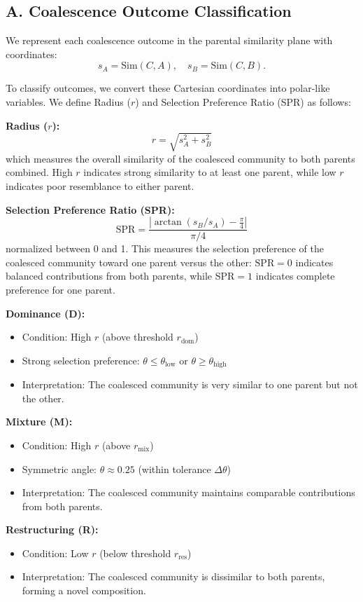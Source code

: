 \subsection*{A. Coalescence Outcome Classification}
\label{sec:suppl:classification}

We represent each coalescence outcome in the parental similarity plane with coordinates:
\begin{equation}
s_A = \text{Sim}(C, A), \quad s_B = \text{Sim}(C, B).
\end{equation}

To classify outcomes, we convert these Cartesian coordinates into polar-like variables. We define Radius ($r$) and Selection Preference Ratio (SPR) as follows:

\textbf{Radius ($r$):}
\begin{equation}
r = \sqrt{s_A^2 + s_B^2}
\end{equation}
which measures the overall similarity of the coalesced community to both parents combined. High $r$ indicates strong similarity to at least one parent, while low $r$ indicates poor resemblance to either parent.

\textbf{Selection Preference Ratio (SPR):}
\begin{equation}
\text{SPR} = \frac{\left| \arctan(s_B / s_A) - \frac{\pi}{4} \right|}{\pi/4}
\end{equation}
normalized between 0 and 1. This measures the selection preference of the coalesced community toward one parent versus the other: $\text{SPR} = 0$ indicates balanced contributions from both parents, while $\text{SPR} = 1$ indicates complete preference for one parent.

\textbf{Dominance (D):}
\begin{itemize}
    \item Condition: High $r$ (above threshold $r_{\text{dom}}$)
    \item Strong selection preference: $\theta \leq \theta_{\text{low}}$ or $\theta \geq \theta_{\text{high}}$
    \item Interpretation: The coalesced community is very similar to one parent but not the other.
\end{itemize}

\textbf{Mixture (M):}
\begin{itemize}
    \item Condition: High $r$ (above $r_{\text{mix}}$)
    \item Symmetric angle: $\theta \approx 0.25$ (within tolerance $\Delta\theta$)
    \item Interpretation: The coalesced community maintains comparable contributions from both parents.
\end{itemize}

\textbf{Restructuring (R):}
\begin{itemize}
    \item Condition: Low $r$ (below threshold $r_{\text{res}}$)
    \item Interpretation: The coalesced community is dissimilar to both parents, forming a novel composition.
\end{itemize}
